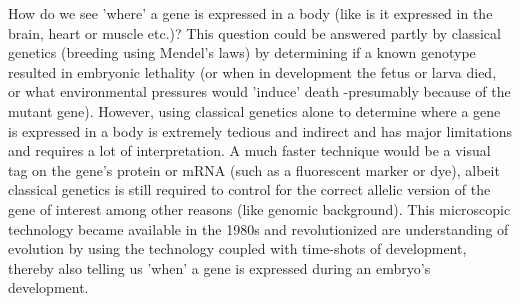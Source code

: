 How do we see 'where' a gene is expressed in a body (like is it expressed in the brain, heart or muscle etc.)?  This question could be answered partly by classical genetics (breeding using Mendel's laws) by determining if a known genotype resulted in embryonic lethality (or when in development the fetus or larva died, or what environmental pressures would 'induce' death -presumably because of the mutant gene).  However, using classical genetics alone to determine where a gene is expressed in a body is extremely tedious and indirect and has major limitations and requires a lot of interpretation.  A much faster technique would be a visual tag on the gene's protein or mRNA (such as a fluorescent marker or dye), albeit classical genetics is still required to control for the correct allelic version of the gene of interest among other reasons (like genomic background).  This microscopic technology became available in the 1980s and revolutionized are understanding of evolution by using the technology coupled with time-shots of development, thereby also telling us 'when' a gene is expressed during an embryo's development.

